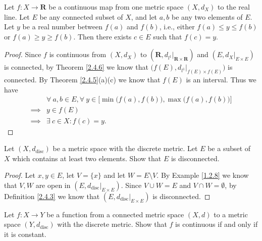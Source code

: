 \begin{corollary}\label{2.4.7}
    Let \(f : X \to \mathbf{R}\) be a continuous map from one metric space \((X, d_X)\) to the real line.
    Let \(E\) be any connected subset of \(X\), and let \(a, b\) be any two elements of \(E\).
    Let \(y\) be a real number between \(f(a)\) and \(f(b)\), i.e., either \(f(a) \leq y \leq f(b)\) or \(f(a) \geq y \geq f(b)\).
    Then there exists \(c \in E\) such that \(f(c) = y\).
\end{corollary}

\begin{proof}
    Since \(f\) is continuous from \((X, d_X)\) to \((\mathbf{R}, d_{l^1}|_{\mathbf{R} \times \mathbf{R}})\) and \((E, d_X|_{E \times E})\) is connected, by Theorem \ref{2.4.6} we know that \(\big(f(E), d_{l^1}|_{f(E) \times f(E)}\big)\) is connected.
    By Theorem \ref{2.4.5}(a)(c) we know that \(f(E)\) is an interval.
    Thus we have
    \begin{align*}
                 & \forall\ a, b \in E, \forall\ y \in \Big[\min\big(f(a), f(b)\big), \max\big(f(a), f(b)\big)\Big] \\
        \implies & y \in f(E)                                                                                       \\
        \implies & \exists\ c \in X : f(c) = y.
    \end{align*}
\end{proof}

\exercisesection

\begin{exercise}\label{ex 2.4.1}
    Let \((X, d_{\text{disc}})\) be a metric space with the discrete metric.
    Let \(E\) be a subset of \(X\) which contains at least two elements.
    Show that \(E\) is disconnected.
\end{exercise}

\begin{proof}
    Let \(x, y \in E\), let \(V = \{x\}\) and let \(W = E \setminus V\).
    By Example \ref{1.2.8} we know that \(V, W\) are open in \((E, d_{\text{disc}}|_{E \times E})\).
    Since \(V \cup W = E\) and \(V \cap W = \emptyset\), by Definition \ref{2.4.3} we know that \((E, d_{\text{disc}}|_{E \times E})\) is disconnected.
\end{proof}

\begin{exercise}\label{ex 2.4.2}
    Let \(f : X \to Y\) be a function from a connected metric space \((X, d)\) to a metric space \((Y, d_{\text{disc}})\) with the discrete metric.
    Show that \(f\) is continuous if and only if it is constant.
\end{exercise}


